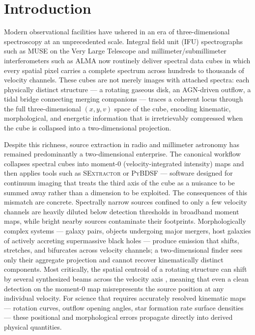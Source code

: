 \section{Introduction}
\label{sec:intro}

Modern observational facilities have ushered in an era of three-dimensional spectroscopy at an unprecedented scale. Integral field unit (IFU) spectrographs such as MUSE on the Very Large Telescope \citep{Bacon2010} and millimeter/submillimeter interferometers such as ALMA now routinely deliver spectral data cubes in which every spatial pixel carries a complete spectrum across hundreds to thousands of velocity channels. These cubes are not merely images with attached spectra: each physically distinct structure --- a rotating gaseous disk, an AGN-driven outflow, a tidal bridge connecting merging companions --- traces a coherent locus through the full three-dimensional $(x, y, v)$ space of the cube, encoding kinematic, morphological, and energetic information that is irretrievably compressed when the cube is collapsed into a two-dimensional projection.

Despite this richness, source extraction in radio and millimeter astronomy has remained predominantly a two-dimensional enterprise. The canonical workflow collapses spectral cubes into moment-0 (velocity-integrated intensity) maps and then applies tools such as \textsc{SExtractor} \citep{Bertin1996} or \textsc{PyBDSF} \citep{Mohan2015} --- software designed for continuum imaging that treats the third axis of the cube as a nuisance to be summed away rather than a dimension to be exploited. The consequences of this mismatch are concrete. Spectrally narrow sources confined to only a few velocity channels are heavily diluted below detection thresholds in broadband moment maps, while bright nearby sources contaminate their footprints. Morphologically complex systems --- galaxy pairs, objects undergoing major mergers, host galaxies of actively accreting supermassive black holes --- produce emission that shifts, stretches, and bifurcates across velocity channels; a two-dimensional finder sees only their aggregate projection and cannot recover kinematically distinct components. Most critically, the spatial centroid of a rotating structure can shift by several synthesized beams across the velocity axis \citep[e.g.,][]{Venemans2020, Decarli2021}, meaning that even a clean detection on the moment-0 map misrepresents the source position at any individual velocity. For science that requires accurately resolved kinematic maps --- rotation curves, outflow opening angles, star formation rate surface densities --- these positional and morphological errors propagate directly into derived physical quantities.

